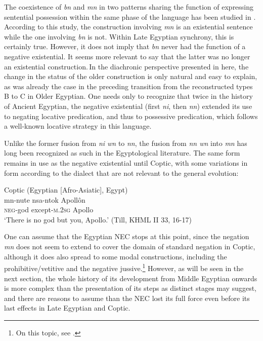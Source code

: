 \documentclass[output=paper,draft,draftmode,colorlinks,citecolor=brown]{langscibook}
\begin{document}
The coexistence of \textit{bn} and \textit{mn} in two patterns sharing the function of expressing sentential possession within the same phase of the language has been studied in \citet{Depuydt2008}.
According to this study, the construction involving \textit{mn} is an existential sentence while the one involving \textit{bn} is not. Within Late Egyptian synchrony, this is certainly true. However, it does not imply that \textit{bn} never had the function of a negative existential. It seems more relevant to say that the latter was no longer an existential construction. In the diachronic perspective presented in here, the change in the status of the older construction is only natural and easy to explain, as was already the case in the preceding transition from the reconstructed types B to C in Older Egyptian. One needs only to recognize that twice in the history of Ancient Egyptian, the negative existential (first \textit{ni}, then \textit{nn}) extended its use to negating locative predication, and thus to possessive predication, which follows a well-known locative strategy in this language. 
 
Unlike the former fusion from \textit{ni wn} to \textit{nn}, the fusion from \textit{nn wn} into \textit{mn} has long been recognized as such in the Egyptological literature. The same form remains in use as the negative existential until Coptic, with some variations in form according to the dialect that are not relevant to the general evolution:  

\ea Coptic (Egyptian [Afro-Asiatic], Egypt) \label{ex:AE45}\\
    \gll mn-nute nsa-ntok Apollôn\\
    \textsc{neg}-god except-\textsc{m.2sg} Apollo\\ 
    \glt ‘There is no god but you, Apollo.’ (Till, KHML II 33, 16-17)
\z
 
One can assume that the Egyptian NEC stops at this point, since the negation \textit{mn} does not seem to extend to cover the domain of standard negation in Coptic, although it does also spread to some modal constructions, including the prohibitive/vetitive and the negative jussive.\footnote{On this topic, see \citet{GrossmanPolisforthcoming}.}
However, as will be seen in the next section, the whole history of its development from Middle Egyptian onwards is more complex than the presentation of its steps as distinct stages may suggest, and there are reasons to assume than the NEC lost its full force even before its last effects in Late Egyptian and Coptic. 
\end{document}
